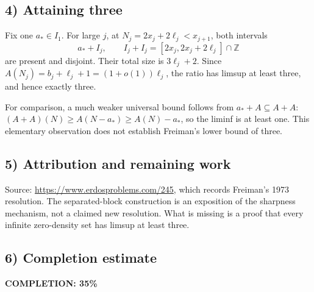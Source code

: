 \subsection{4) Attaining three}
Fix one $a_*\in I_1$. For large $j$, at
$N_j=2x_j+2\ell_j<x_{j+1}$, both intervals
\[
 a_*+I_j,\qquad I_j+I_j=[2x_j,2x_j+2\ell_j]\cap\mathbb Z
\]
are present and disjoint. Their total size is $3\ell_j+2$.
Since $A(N_j)=b_j+\ell_j+1=(1+o(1))\ell_j$,
the ratio has limsup at least three, and hence exactly three.

For comparison, a much weaker universal bound follows from
$a_*+A\subseteq A+A$:
$(A+A)(N)\geq A(N-a_*)\geq A(N)-a_*$, so the liminf is at
least one. This elementary observation does not establish
Freiman's lower bound of three.

\subsection{5) Attribution and remaining work}
Source: \url{https://www.erdosproblems.com/245}, which records
Freiman's 1973 resolution. The separated-block construction is
an exposition of the sharpness mechanism, not a claimed new
resolution. What is missing is a proof that every infinite
zero-density set has limsup at least three.
\subsection{6) Completion estimate}
\textbf{COMPLETION: 35\%}
